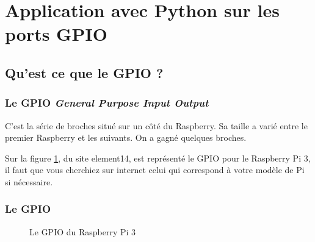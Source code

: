 \section{Application avec Python sur les ports GPIO}

\subsection{Qu'est ce que le GPIO ?}

\begin{frame}[containsverbatim]
\frametitle{Le GPIO \emph{General Purpose Input Output}}

C'est la série de broches situé sur un côté du Raspberry. Sa taille a varié entre le premier Raspberry et les suivants. On a gagné quelques broches.

Sur la figure \ref{img_gpio}, du site element14, est représenté le GPIO pour le Raspberry Pi 3, il faut que vous cherchiez sur internet celui qui correspond à votre modèle de Pi si nécessaire.

\end{frame}

\begin{frame}[containsverbatim]
\frametitle{Le GPIO}

\begin{center}
\begin{figure}
	\caption{Le GPIO du Raspberry Pi 3}
	\label{img_gpio}
\end{figure}
\end{center}

\end{frame}

